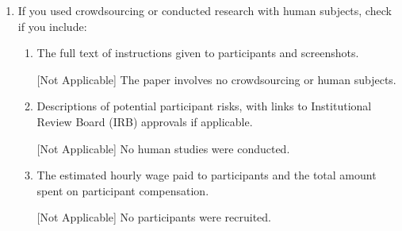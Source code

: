 \documentclass[twoside]{article}
\begin{document}
\begin{enumerate}
\begin{enumerate}
[Yes]
We state that the \texttt{FrankWolfe.jl} is MIT license and include license details for any external packages used.
\item New assets either in the supplemental material or as a URL, if applicable.

[Yes]
We release an anonymized code archive in the supplementary material. A public repository will be posted on GitHub upon publication with code, logs, and scripts.
\item Information about consent from data providers/curators.

[Not Applicable]
All data are synthetic and generated as described. No external providers or human data are involved.
\item Discussion of sensible content if applicable, e.g., personally identifiable information or offensive content.

[Not Applicable]
The work contains no sensitive content or personally identifiable information. Synthetic instances contain only randomly generated numeric data.
\end{enumerate}

\item If you used crowdsourcing or conducted research with human subjects, check if you include:
\begin{enumerate}
\item The full text of instructions given to participants and screenshots.

[Not Applicable]
The paper involves no crowdsourcing or human subjects.
\item Descriptions of potential participant risks, with links to Institutional Review Board (IRB) approvals if applicable.

[Not Applicable]
No human studies were conducted.
\item The estimated hourly wage paid to participants and the total amount spent on participant compensation. 

[Not Applicable]
No participants were recruited.
\end{enumerate}

\end{enumerate}



\clearpage
\appendix
\thispagestyle{empty}

\onecolumn
{}
\end{document}
